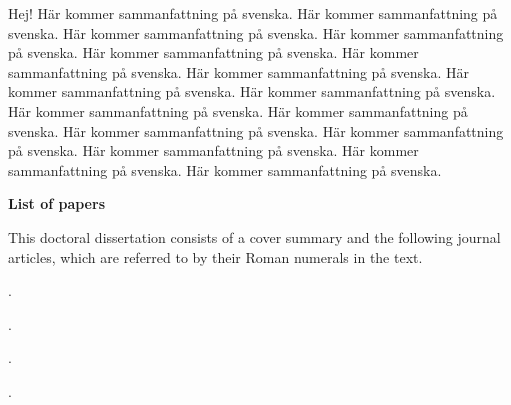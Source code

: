 \documentclass[a4paper]{kappa}
\begin{document}
\begin{frontmatter}
\begin{svabstract}

Hej!
Här kommer sammanfattning på svenska. Här kommer sammanfattning på svenska.
Här kommer sammanfattning på svenska. Här kommer sammanfattning på svenska.
Här kommer sammanfattning på svenska. Här kommer sammanfattning på svenska.
Här kommer sammanfattning på svenska. Här kommer sammanfattning på svenska.
Här kommer sammanfattning på svenska. Här kommer sammanfattning på svenska.
Här kommer sammanfattning på svenska. Här kommer sammanfattning på svenska.
Här kommer sammanfattning på svenska. Här kommer sammanfattning på svenska.
Här kommer sammanfattning på svenska. Här kommer sammanfattning på svenska.

\end{svabstract}


\begin{thepapers}

\textbf{List of papers}

This doctoral dissertation consists of a cover summary and the following
journal articles, which are referred to by their Roman numerals in the text.

\begin{paper}
  \item {}.
  \item {}.
  \item {}.
  \item {}.
\end{paper}

\vfill


\end{thepapers}
\end{frontmatter}
\end{document}

